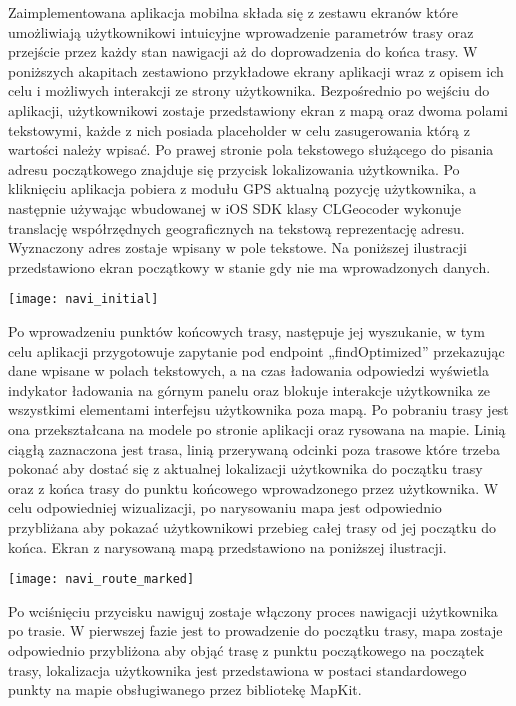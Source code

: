 Zaimplementowana aplikacja mobilna składa się z zestawu ekranów które umożliwiają użytkownikowi intuicyjne wprowadzenie parametrów trasy oraz przejście przez każdy stan nawigacji aż do doprowadzenia do końca trasy. W poniższych akapitach zestawiono przykładowe ekrany aplikacji wraz z opisem ich celu i możliwych interakcji ze strony użytkownika.
Bezpośrednio po wejściu do aplikacji, użytkownikowi zostaje przedstawiony ekran z mapą oraz dwoma polami tekstowymi, każde z nich posiada placeholder w celu zasugerowania którą z wartości należy wpisać. Po prawej stronie pola tekstowego służącego do pisania adresu początkowego znajduje się przycisk lokalizowania użytkownika. Po kliknięciu aplikacja pobiera z modułu GPS aktualną pozycję użytkownika, a następnie używając wbudowanej w iOS SDK klasy CLGeocoder wykonuje translację współrzędnych geograficznych na tekstową reprezentację adresu. Wyznaczony adres zostaje wpisany w pole tekstowe. Na poniższej ilustracji przedstawiono ekran początkowy w stanie gdy nie ma wprowadzonych danych.

\begin{center}
\texttt{[image: navi\_initial]}
\end{center}

Po wprowadzeniu punktów końcowych trasy, następuje jej wyszukanie, w tym celu aplikacji przygotowuje zapytanie pod endpoint „findOptimized” przekazując dane wpisane w polach tekstowych, a na czas ładowania odpowiedzi wyświetla indykator ładowania na górnym panelu oraz blokuje interakcje użytkownika ze wszystkimi elementami interfejsu użytkownika poza mapą. Po pobraniu trasy jest ona przekształcana na modele po stronie aplikacji oraz rysowana na mapie. Linią ciągłą zaznaczona jest trasa, linią przerywaną odcinki poza trasowe które trzeba pokonać aby dostać się z aktualnej lokalizacji użytkownika do początku trasy oraz z końca trasy do punktu końcowego wprowadzonego przez użytkownika. W celu odpowiedniej wizualizacji, po narysowaniu mapa jest odpowiednio przybliżana aby pokazać użytkownikowi przebieg całej trasy od jej początku do końca. Ekran z narysowaną mapą przedstawiono na poniższej ilustracji.

\begin{center}
\texttt{[image: navi\_route\_marked]}
\end{center}

Po wciśnięciu przycisku nawiguj zostaje włączony proces nawigacji użytkownika po trasie. W pierwszej fazie jest to prowadzenie do początku trasy, mapa zostaje odpowiednio przybliżona aby objąć trasę z punktu początkowego na początek trasy, lokalizacja użytkownika jest przedstawiona w postaci standardowego punkty na mapie obsługiwanego przez bibliotekę MapKit.

